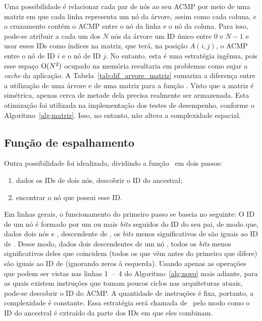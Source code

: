 Uma possibilidade é relacionar cada par de nós ao seu ACMP por meio de uma matriz
em que cada linha representa um nó da árvore, assim como cada coluna, e o cruzamento contém o ACMP entre o nó da linha e o nó da coluna.
Para isso, pode-se atribuir a cada um dos $N$ nós da árvore um ID único entre $0$ e $N-1$ e usar esses IDs como índices na matriz,
que terá, na posição $A(i,j)$, o ACMP entre o nó de ID $i$ e o nó de ID $j$.
No entanto, esta é uma estratégia ingênua, pois esse espaço $\operatorname{O}(N^2)$ ocupado na memória resultaria em problemas como sujar a \textit{cache} da aplicação.
A Tabela~\ref{tab:dif_arvore_matriz} sumariza a diferença entre a utilização de uma árvore e de uma matriz para a função \fACMP.
Visto que a matriz é simétrica, apenas cerca de metade dela precisa realmente ser armazenada.
Esta otimização foi utilizada na implementação dos testes de desempenho, conforme o Algoritmo~\ref{alg:matriz}.
Isso, no entanto, não altera a complexidade espacial.





\subsection{Função de espalhamento}

Outra possibilidade foi idealizada, dividindo a função \ACMPIDs\ em dois passos:
\begin{enumerate}
	\item dados os IDs de dois nós, descobrir o ID do ancestral;
	\item encontrar o nó que possui esse ID.
\end{enumerate}
Em linhas gerais, o funcionamento do primeiro passo se baseia no seguinte:
O ID de um nó é formado por um ou mais \textit{bits} seguidos do ID do seu pai, de modo que, dados dois nós  e ,  descendente de ,
os \textit{bits} menos significativos de  são iguais ao ID de .
Desse modo, dados dois descendentes de um nó , todos os \textit{bits} menos significativos deles que coincidem
(todos os que vêm antes do primeiro que difere) são iguais ao ID de  (ignorando zeros à esquerda).
Usando apenas as operações que podem ser vistas nas linhas 1~--~4 do Algoritmo~\ref{alg:novo} mais adiante,
para as quais existem instruções que tomam poucos ciclos nas arquiteturas atuais, pode-se descobrir o ID do ACMP.
A quantidade de instruções é fixa, portanto, a complexidade é constante.
Essa estratégia será chamada de \Novo\ pelo modo como o ID do ancestral é extraído da parte dos IDs em que eles combinam.

